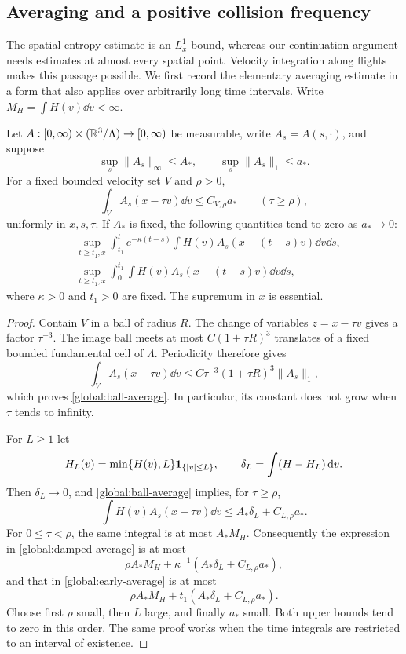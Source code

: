 \subsection{Averaging and a positive collision frequency}

The spatial entropy estimate is an $L^1_x$ bound, whereas our
continuation argument needs estimates at almost every spatial point.
Velocity integration along flights makes this passage possible.  We
first record the elementary averaging estimate in a form that also
applies over arbitrarily long time intervals.  Write
$M_H=\int H(v)\dd v<\infty$.

\begin{lemma}\label{global:flight-average}
Let $A:[0,\infty)\times(\mathbb R^3/\Lambda)\to[0,\infty)$ be measurable,
write $A_s=A(s,\cdot)$, and suppose
\[
 \sup_s\|A_s\|_\infty\le A_*,\qquad
 \sup_s\|A_s\|_1\le a_*.
\]
For a fixed bounded velocity set $V$ and $\rho>0$,
\begin{equation}\label{global:ball-average}
 \int_V A_s(x-\tau v)\dd v
 \le C_{V,\rho}a_*
 \qquad(\tau\ge\rho),
\end{equation}
uniformly in $x,s,\tau$.  If $A_*$ is fixed, the following quantities
tend to zero as $a_*\to0$:
\begin{align}
 &\sup_{t\ge t_1,x}
 \int_{t_1}^t e^{-\kappa(t-s)}
       \int H(v)A_s(x-(t-s)v)\dd v\dd s,
       \label{global:damped-average}\\
 &\sup_{t\ge t_1,x}
 \int_0^{t_1}\int H(v)A_s(x-(t-s)v)\dd v\dd s,
       \label{global:early-average}
\end{align}
where $\kappa>0$ and $t_1>0$ are fixed.  The supremum in $x$ is essential.
\end{lemma}

\begin{proof}
Contain $V$ in a ball of radius $R$.  The change of variables
$z=x-\tau v$ gives a factor $\tau^{-3}$.  The image ball meets at most
$C(1+\tau R)^3$ translates of a fixed bounded fundamental cell of
$\Lambda$.  Periodicity therefore gives
\[
 \int_V A_s(x-\tau v)\dd v
 \le C\tau^{-3}(1+\tau R)^3\|A_s\|_1,
\]
which proves \eqref{global:ball-average}.  In particular, its constant
does not grow when $\tau$ tends to infinity.

For $L\ge1$ let
\[
 H_L(v)=\min\{H(v),L\}\mathbf 1_{\{|v|\le L\}},\qquad
 \delta_L=\int(H-H_L)\,\mathrm d v.
\]
Then $\delta_L\to0$, and \eqref{global:ball-average} implies, for
$\tau\ge\rho$,
\begin{equation}\label{global:weighted-average}
 \int H(v)A_s(x-\tau v)\dd v
 \le A_*\delta_L+C_{L,\rho}a_*.
\end{equation}
For $0\le\tau<\rho$, the same integral is at most $A_*M_H$.
Consequently the expression in \eqref{global:damped-average} is at most
\[
 \rho A_*M_H+\kappa^{-1}
       (A_*\delta_L+C_{L,\rho}a_*),
\]
and that in \eqref{global:early-average} is at most
\[
 \rho A_*M_H+t_1(A_*\delta_L+C_{L,\rho}a_*).
\]
Choose first $\rho$ small, then $L$ large, and finally $a_*$ small.
Both upper bounds tend to zero in this order.  The same proof works
when the time integrals are restricted to an interval of existence.
\end{proof}

